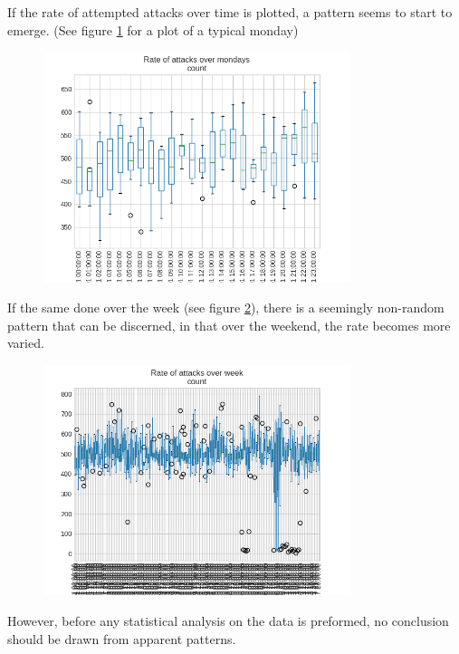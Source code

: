     If the rate of attempted attacks over time is plotted, 
    a pattern seems to start to emerge. (See figure \ref{fig:over_monday}
    for a plot of a typical monday)
    \begin{figure}
        \includegraphics[width=0.8\textwidth]{src/images/OverMonday.png}
        \label{fig:over_monday}
    \end{figure}

    If the same done over the week (see figure \ref{fig:over_week}), there is a seemingly
    non-random pattern that can be discerned, in that 
    over the weekend, the rate becomes more varied.

    \begin{figure}
        \includegraphics[width=0.8\textwidth]{src/images/week_unfiltered.png} 
        \label{fig:over_week}
    \end{figure}

    However, before any statistical analysis on the data is
    preformed, no conclusion should be drawn from apparent
    patterns.


